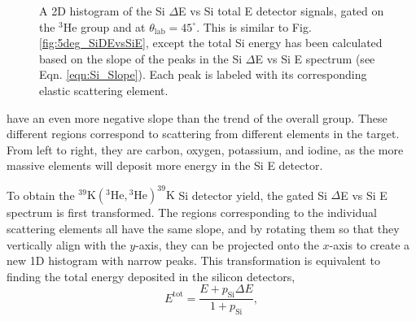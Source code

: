 \begin{figure}
\caption{\label{fig:5deg_SiDEvsSiTotE}A 2D histogram of the Si $\Delta$E vs Si total E detector signals, gated on the $^{3}$He group and at $\theta_{\mathrm{lab}} = 45^{\circ}$. This is similar to Fig. \ref{fig:5deg_SiDEvsSiE}, except the total Si energy has been calculated based on the slope of the peaks in the Si $\Delta$E vs Si E spectrum (see Eqn. \ref{eqn:Si_Slope}). Each peak is labeled with its corresponding elastic scattering element.}
\end{figure}

\newpage

\noindent
have an even more negative slope than the trend of the overall group. These different regions correspond to scattering from different elements in the target. From left to right, they are carbon, oxygen, potassium, and iodine, as the more massive elements will deposit more energy in the Si E detector. 

To obtain the $^{39}\mathrm{K}(^{3}\mathrm{He}, {}^{3}\mathrm{He})^{39}\mathrm{K}$ Si detector yield, the gated Si $\Delta$E vs Si E spectrum is first transformed. The regions corresponding to the individual scattering elements all have the same slope, and by rotating them so that they vertically align with the $y$-axis, they can be projected onto the $x$-axis to create a new 1D histogram with narrow peaks. This transformation is equivalent to finding the total energy deposited in the silicon detectors,
\begin{equation} \label{eqn:Si_Slope}
E^{\mathrm{tot}} = \frac{E + p_{\mathrm{Si}}\Delta E}{1 + p_{\mathrm{Si}}},
\end{equation}

